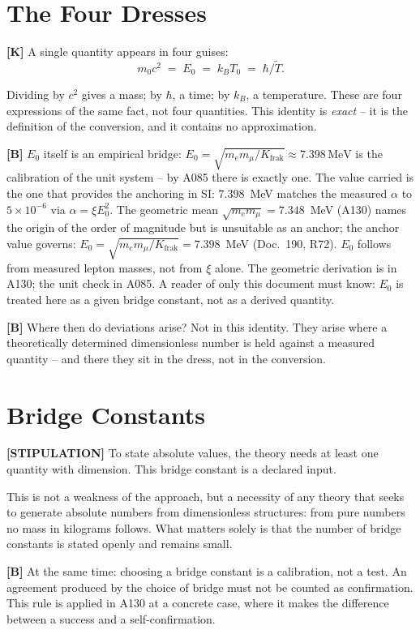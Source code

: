 \section{The Four Dresses}

\textbf{[K]} A single quantity appears in four guises:
\[
  m_0 c^2 \;=\; E_0 \;=\; k_B T_0 \;=\; \hbar/\tilde T .
\]

Dividing by $c^2$ gives a mass; by $\hbar$, a time; by $k_B$, a temperature.
These are four expressions of the same fact, not four quantities. This identity
is \emph{exact} -- it is the definition of the conversion, and it contains no
approximation.

\textbf{[B]} $E_0$ itself is an empirical bridge: $E_0=\sqrt{m_em_\mu/K_\text{frak}}
\approx7{.}398\,\text{MeV}$ is the calibration of the unit system -- by A085 there is exactly one. The value carried is the one that provides the anchoring in SI: $7{.}398$~MeV matches the measured $\alpha$ to $5\times10^{-6}$ via $\alpha = \xi E_0^2$. The geometric mean $\sqrt{m_em_\mu} = 7{.}348$~MeV (A130) names the origin of the order of magnitude but is unsuitable as an anchor; the anchor value governs: $E_0 = \sqrt{m_em_\mu/K_\text{frak}} = 7{.}398$~MeV (Doc.~190, R72). $E_0$ follows from measured lepton masses, not from $\xi$
alone. The geometric derivation is in A130; the unit check in A085. A reader
of only this document must know: $E_0$ is treated here as a given bridge
constant, not as a derived quantity.

\textbf{[B]} Where then do deviations arise? Not in this identity. They arise
where a theoretically determined dimensionless number is held against a measured
quantity -- and there they sit in the dress, not in the conversion.

\section{Bridge Constants}

\textbf{[STIPULATION]} To state absolute values, the theory needs at least one
quantity with dimension. This bridge constant is a declared input.

This is not a weakness of the approach, but a necessity of any theory that
seeks to generate absolute numbers from dimensionless structures: from pure
numbers no mass in kilograms follows. What matters solely is that the number of
bridge constants is stated openly and remains small.

\textbf{[B]} At the same time: choosing a bridge constant is a calibration,
not a test. An agreement produced by the choice of bridge must not be counted
as confirmation. This rule is applied in A130 at a concrete case, where it
makes the difference between a success and a self-confirmation.


